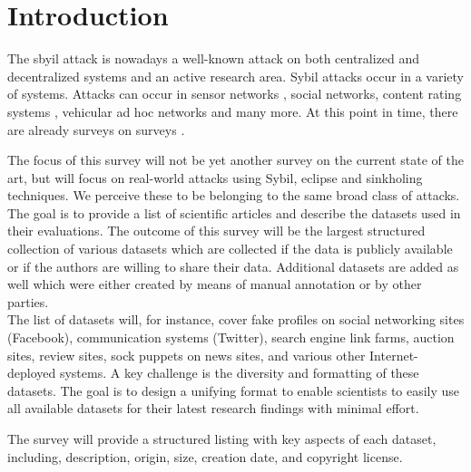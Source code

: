 \section{Introduction}

	The sbyil attack \cite{douceur2002sybil} is nowadays a well-known attack on both centralized and decentralized systems and an active research area.
	Sybil attacks occur in a variety of systems. 
	Attacks can occur in sensor networks , social networks, content rating systems \cite{kakhki11mitigating}, vehicular ad hoc networks and many more.
	At this point in time, there are already surveys on surveys \cite{koll2014state, mohaisen2013sybil, viswanath2011analysis}.
	
	The focus of this survey will not be yet another survey on the current state of the art, but  will focus on real-world attacks using Sybil, eclipse and sinkholing techniques. 
	We perceive these to be belonging to the same broad class of attacks. 
	The goal is to provide a list of scientific articles and describe the datasets used in their evaluations.
	The outcome of this survey will be the largest structured collection of various datasets which are collected if the data is publicly available or if the authors are willing to share their data. Additional datasets are added as well which were either created by means of manual annotation or by other parties.\\
	The list of datasets will, for instance, cover fake profiles on social networking sites (Facebook), communication systems (Twitter), search engine link farms, auction sites, review sites, sock puppets on news sites, and various other Internet-deployed systems. 
	A key challenge is the diversity and formatting of these datasets. 
	The goal is to design a unifying format to enable scientists to easily use all available datasets for their latest research findings with minimal effort.
	
	The survey will provide a structured listing with key aspects of each dataset, including, description, origin, size, creation date, and copyright license.
